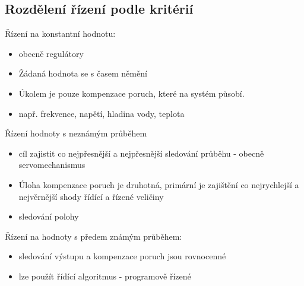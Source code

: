 \subsection*{Rozdělení řízení podle kritérií}
Řízení na konstantní hodnotu:
\begin{itemize}
    \item obecně regulátory
    \item Žádaná hodnota se s časem němění
    \item Úkolem je pouze kompenzace poruch, které na systém působí.
    \item např. frekvence, napětí, hladina vody, teplota
\end{itemize}
Řízení hodnoty s neznámým průběhem
\begin{itemize}
    \item cíl zajistit co nejpřesnější a nejpřesnější sledování průběhu - obecně servomechanismus
    \item Úloha kompenzace poruch je druhotná, primární je zajištění co nejrychlejší a nejvěrnější shody řídící a řízené veličiny
    \item sledování polohy
\end{itemize}
Řízení na hodnoty s předem známým průběhem:
\begin{itemize}
    \item sledování výstupu a kompenzace poruch jsou rovnocenné
    \item lze použít řídící algoritmus - programově řízené
\end{itemize}
